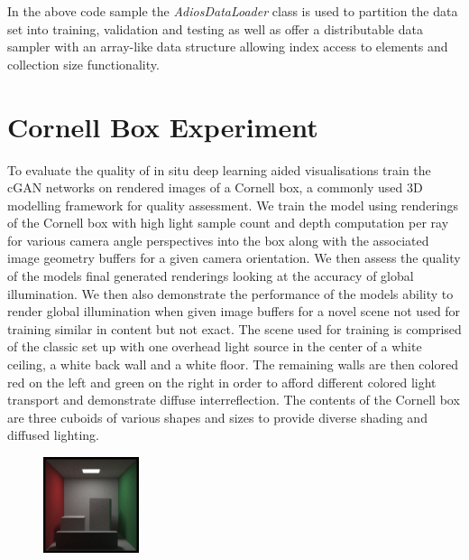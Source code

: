 \documentclass[conference]{IEEEtran}
\begin{document}




In the above code sample the {\it AdiosDataLoader} class is used to partition the data set into training, validation and testing as well as offer a distributable data sampler with an array-like data structure allowing index access to elements and collection size functionality.


\section{Cornell Box Experiment}

To evaluate the quality of in situ deep learning aided visualisations train the cGAN networks on rendered images of a Cornell box, a commonly used 3D modelling framework for quality assessment. We train the model using renderings of the Cornell box with high light sample count and depth computation per ray for various camera angle perspectives into the box along with the associated image geometry buffers for a given camera orientation. We then assess the quality of the models final generated renderings looking at the accuracy of global illumination. We then also demonstrate the performance of the models ability to render global illumination when given image buffers for a novel scene not used for training similar in content but not exact. The scene used for training is comprised of the classic set up with one overhead light source in the center of a white ceiling, a white back wall and a white floor. The remaining walls are then colored red on the left and green on the right in order to afford different colored light transport and demonstrate diffuse interreflection. The contents of the Cornell box are three cuboids of various shapes and sizes to provide diverse shading and diffused lighting. 

\begin{figure}[h]
\includegraphics[width=0.25\textwidth]{sc-1080-d-45.png}
\end{figure}
\end{document}
